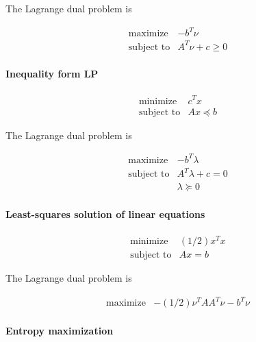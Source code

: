 The Lagrange dual problem is

\begin{equation}
\begin{array}{ll}
\mbox{maximize} & -b^T \nu
\\
\mbox{subject to} & A^T \nu + c \geq0
\end{array}
\end{equation}

\paragraph{Inequality form LP}

\begin{equation}
\begin{array}{ll}
\mbox{minimize} & c^T x
\\
\mbox{subject to} & Ax \preceq b
\end{array}
\end{equation}

The Lagrange dual problem is

\begin{equation}
\begin{array}{ll}
\mbox{maximize} & -b^T \lambda
\\
\mbox{subject to} & A^T \lambda + c = 0
\\
& \lambda \succeq 0
\end{array}
\end{equation}


\paragraph{Least-squares solution of linear equations}

\begin{equation}
\begin{array}{ll}
\mbox{minimize} & (1/2) x^T x
\\
\mbox{subject to} & Ax = b
\end{array}
\end{equation}

The Lagrange dual problem is

\begin{equation}
\begin{array}{ll}
\mbox{maximize} & -(1/2) \nu^T A A^T \nu - b^T \nu
\end{array}
\end{equation}



\paragraph{Entropy maximization}

